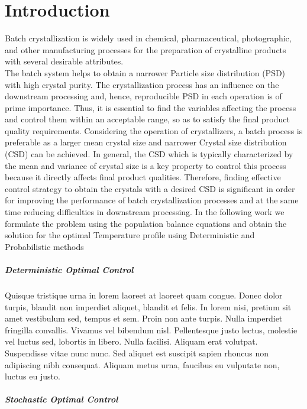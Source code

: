 \chapter{Introduction}
Batch crystallization is widely used in chemical, pharmaceutical, photographic, and other manufacturing processes for the preparation of crystalline products with several desirable attributes. \\
The batch system helps to obtain a narrower Particle size distribution (PSD) with high crystal purity. The crystallization process has an influence on the downstream processing and, hence, reproducible PSD in each operation is of prime importance. Thus, it is essential to find the variables affecting the process and control them within an acceptable range, so as to satisfy the final product quality requirements.
Considering the operation of crystallizers, a batch process is preferable as a larger mean crystal size and narrower Crystal size distribution (CSD) can be achieved. In general, the CSD which is typically characterized by the mean and variance of crystal size is a key property to control this process because it directly affects final product qualities. Therefore, finding effective control strategy to obtain the crystals with a desired CSD is significant in order for improving the performance of batch crystallization processes and at the same time reducing difficulties in downstream processing.
In the following work we formulate the problem using the population balance equations and obtain the solution for the optimal Temperature profile using Deterministic and Probabilistic methods 


\paragraph{Deterministic Optimal Control} 

Quisque tristique urna in lorem laoreet at laoreet quam congue. Donec dolor turpis, blandit non imperdiet aliquet, blandit et felis. In lorem nisi, pretium sit amet vestibulum sed, tempus et sem. Proin non ante turpis. Nulla imperdiet fringilla convallis. Vivamus vel bibendum nisl. Pellentesque justo lectus, molestie vel luctus sed, lobortis in libero. Nulla facilisi. Aliquam erat volutpat. Suspendisse vitae nunc nunc. Sed aliquet est suscipit sapien rhoncus non adipiscing nibh consequat. Aliquam metus urna, faucibus eu vulputate non, luctus eu justo.

\paragraph{Stochastic Optimal Control}

